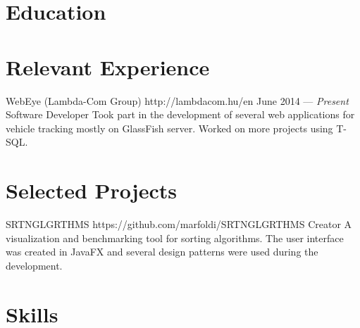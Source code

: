 \documentclass{resume}
\begin{document}

\smallskip

\section{Education}


\section{Relevant Experience}

\employer
	{WebEye (Lambda-Com Group)}
	{http://lambdacom.hu/en}
	{June 2014 --- \emph{Present}}
	{Software Developer}
	{Took part in the development of several web applications for vehicle tracking mostly on GlassFish server. Worked on more projects using T-SQL.}
	
\section{Selected Projects}

\project
{SRTNGLGRTHMS}
{https://github.com/marfoldi/SRTNGLGRTHMS}
{Creator}
{A visualization and benchmarking tool for sorting algorithms. The user interface was created in JavaFX and several design patterns were used during the development.}
	
\section{Skills}

\end{document}
